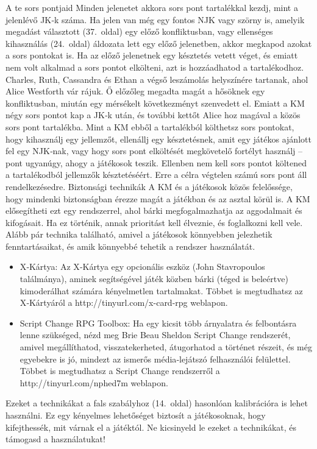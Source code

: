 \documentclass[oneside]{book}
\newcommand{\page}[1]{#1.~oldal}
\begin{document}
A te sors pontjaid
Minden jelenetet akkora sors pont tartalékkal kezdj, mint a jelenlévő JK‑k száma. Ha jelen van még egy fontos NJK vagy szörny is, amelyik megadást választott (\page{37}) egy előző konfliktusban, vagy ellenséges kihasználás (\page{24}) áldozata lett egy előző jelenetben, akkor megkapod azokat a sors pontokat is. Ha az előző jelenetnek egy késztetés vetett véget, és emiatt nem volt alkalmad a sors pontot elkölteni, azt is hozzáadhatod a tartalékodhoz.
Charles, Ruth, Cassandra és Ethan a végső leszámolás helyszínére tartanak, ahol Alice Westforth vár rájuk. Ő előzőleg megadta magát a hősöknek egy konfliktusban, miután egy mérsékelt következményt szenvedett el. Emiatt a KM négy sors pontot kap a JK‑k után, és további kettőt Alice hoz magával a közös sors pont tartalékba.
Mint a KM ebből a tartalékból költhetsz sors pontokat, hogy kihasználj egy jellemzőt, ellenállj egy késztetésnek, amit egy játékos ajánlott fel egy NJK‑nak, vagy hogy sors pont elköltését megkövetelő fortélyt használj – pont ugyanúgy, ahogy a játékosok teszik.
Ellenben nem kell sors pontot költened a tartalékodból jellemzők késztetéséért. Erre a célra végtelen számú sors pont áll rendelkezésedre.
Biztonsági technikák
A KM és a játékosok közös felelőssége, hogy mindenki biztonságban érezze magát a játékban és az asztal körül is. A KM elősegítheti ezt egy rendszerrel, ahol bárki megfogalmazhatja az aggodalmait és kifogásait. Ha ez történik, annak prioritást kell élveznie, és foglalkozni kell vele. Alább pár technika található, amivel a játékosok könnyebben jelezhetik fenntartásaikat, és amik könnyebbé tehetik a rendszer használatát.

\begin{itemize}
    \item X‑Kártya: Az X‑Kártya egy opcionális eszköz (John Stavropoulos találmánya), aminek segítségével játék közben bárki (téged is beleértve) kimoderálhat számára kényelmetlen tartalmakat. Többet is megtudhatsz az X‑Kártyáról a http://tinyurl.com/x-card-rpg weblapon.
    \item Script Change RPG Toolbox: Ha egy kicsit több árnyalatra és felbontásra lenne szükséged, nézd meg Brie Beau Sheldon Script Change rendszerét, amivel megállíthatod, visszatekerheted, átugorhatod a történet részeit, és még egyebekre is jó, mindezt az ismerős média‑lejátszó felhasználói felülettel. Többet is megtudhatsz a Script Change rendszerről a http://tinyurl.com/nphed7m weblapon.
\end{itemize}

Ezeket a technikákat a fals szabályhoz (\page{14}) hasonlóan kalibrációra is lehet használni. Ez egy kényelmes lehetőséget biztosít a játékosoknak, hogy kifejthessék, mit várnak el a játéktól. Ne kicsinyeld le ezeket a technikákat, és támogasd a használatukat!
\end{document}
